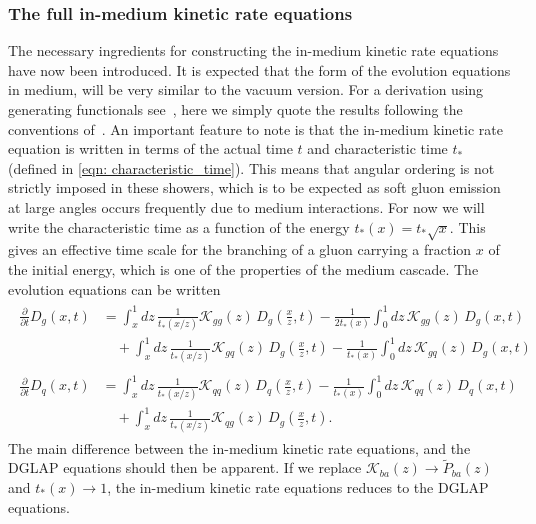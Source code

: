 \documentclass[main.tex]{subfiles}
\begin{document}
\subsubsection*{The full in-medium kinetic rate equations}
The necessary ingredients for constructing the in-medium kinetic rate equations have now been introduced. It is expected that the form of the evolution equations in medium, will be very similar to the vacuum version. For a derivation using generating functionals see~\cite{Probabilistic_picture}, here we simply quote the results following the conventions of~\cite{Energy_flow_medium_cascade_2016}. An important feature to note is that the in-medium kinetic rate equation is written in terms of the actual time \(t\) and characteristic time \(t_*\) (defined in \autoref{eqn: characteristic_time}). This means that angular ordering is not strictly imposed in these showers, which is to be expected as soft gluon emission at large angles occurs frequently due to medium interactions. For now we will write the characteristic time as a function of the energy \(t_*(x) = t_* \sqrt{x}\). This gives an effective time scale for the branching of a gluon carrying a fraction \(x\) of the initial energy, which is one of the properties of the medium cascade. The evolution equations can be written
\begin{align}\label{eqn: BDMPS_gluons}
\begin{split}
    \frac{\partial}{\partial t} D_g(x,t) &= \int_x^1 dz\, \frac{1}{t_*(x/z)} \mathcal{K}_{gg}(z)\, D_g\left(\frac{x}{z}, t\right) - \frac{1}{2t_*(x)} \int_0^1 dz\, \mathcal{K}_{gg}(z)\, D_g \left(x,t\right) \\
    &\quad + \int_x^1 dz\, \frac{1}{t_*(x/z)} \mathcal{K}_{gq}(z)\, D_g\left(\frac{x}{z}, t\right) - \frac{1}{t_*(x)} \int_0^1 dz\, \mathcal{K}_{gq}(z)\, D_g \left(x,t\right)
\end{split}
\end{align}
\begin{align}\label{eqn: BDMPS_quarks}
\begin{split}
    \frac{\partial}{\partial t} D_q(x,t) &= \int_x^1 dz\, \frac{1}{t_*(x/z)} \mathcal{K}_{qq}(z)\, D_q\left(\frac{x}{z}, t\right) -\frac{1}{t_*(x)} \int_0^1 dz\, \mathcal{K}_{qq}(z)\, D_q \left(x,t\right) \\
    &\quad + \int_x^1 dz\, \frac{1}{t_*(x/z)} \mathcal{K}_{qg}(z)\, D_g\left(\frac{x}{z}, t\right).
\end{split}
\end{align}
The main difference between the in-medium kinetic rate equations, and the DGLAP equations should then be apparent. If we replace \(\mathcal{K}_{ba}(z) \rightarrow \tilde{P}_{ba}(z)\) and \(t_*(x)\rightarrow 1\), the in-medium kinetic rate equations reduces to the DGLAP equations.
\end{document}
